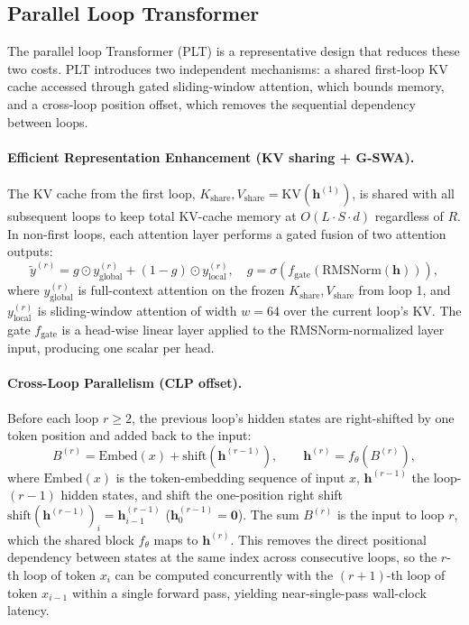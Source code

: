 \documentclass{llmxive}
\providecommand{\hidden}{\mathbf{h}}
\providecommand{\block}{f_\theta}
\providecommand{\loopcount}{R}
\begin{document}
\subsection{Parallel Loop Transformer}
\label{sec:plt-arch}
The parallel loop Transformer (PLT) \citep{wu2025parallel} is a representative design that reduces these two costs. PLT introduces two independent mechanisms: a shared first-loop KV cache accessed through gated sliding-window attention, which bounds memory, and a cross-loop position offset,
which removes the sequential dependency between loops.

\paragraph{Efficient Representation Enhancement (KV sharing + G-SWA).}
The KV cache from the first loop,
$K_{\text{share}}, V_{\text{share}} = \mathrm{KV}(\hidden^{(1)})$,
is shared with all subsequent loops to keep total KV-cache memory at
$O(L \cdot S \cdot d)$ regardless of $\loopcount$.
In non-first loops, each attention layer performs a gated fusion of two
attention outputs:
\begin{equation}
  \tilde{y}^{(r)} = g \odot y_{\text{global}}^{(r)}
                   + (1 - g) \odot y_{\text{local}}^{(r)},
  \quad g = \sigma\!\left(f_{\text{gate}}(\mathrm{RMSNorm}(\hidden))\right),
  \label{eq:gswa}
\end{equation}
where $y_{\text{global}}^{(r)}$ is full-context attention on the frozen
$K_{\text{share}}, V_{\text{share}}$ from loop 1, and $y_{\text{local}}^{(r)}$
is sliding-window attention of width $w = 64$ over the current loop's KV. The gate $f_{\text{gate}}$ is a head-wise linear layer applied to the
RMSNorm-normalized layer input, producing one scalar per head.
\paragraph{Cross-Loop Parallelism (CLP offset).}
Before each loop $r \geq 2$, the previous loop's hidden states are
right-shifted by one token position and added back to the input:
\begin{equation}
  B^{(r)} = \mathrm{Embed}(x) + \mathrm{shift}\!\left(\hidden^{(r-1)}\right),
  \qquad
  \hidden^{(r)} = \block\!\left(B^{(r)}\right),
  \label{eq:clp}
\end{equation}
where $\mathrm{Embed}(x)$ is the token-embedding sequence of input $x$,
$\hidden^{(r-1)}$ the loop-$(r-1)$ hidden states, and $\mathrm{shift}$ the
one-position right shift $\mathrm{shift}(\hidden^{(r-1)})_i=\hidden^{(r-1)}_{i-1}$
($\hidden^{(r-1)}_{0}=\mathbf{0}$). The sum $B^{(r)}$ is the input to loop $r$,
which the shared block $\block$ maps to $\hidden^{(r)}$.
This removes the direct positional dependency between states at the same
index across consecutive loops, so the $r$-th loop of token $x_i$ can be
computed concurrently with the $(r+1)$-th loop of token $x_{i-1}$ within a
single forward pass, yielding near-single-pass wall-clock latency.
\end{document}

